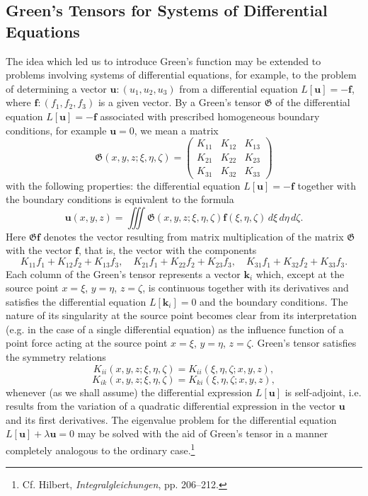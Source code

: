 \subsection{Green's Tensors for Systems of Differential Equations}
The idea which led us to introduce Green's function may be extended to problems involving systems of differential equations, for example, to the problem of determining a vector $\mathbf u:(u_1,u_2,u_3)$ from a differential equation $L[\mathbf u]=-\mathbf f$, where $\mathbf f:(f_1,f_2,f_3)$ is a given vector. By a Green's tensor $\mathfrak G$ of the differential equation $L[\mathbf u]=-\mathbf f$ associated with prescribed homogeneous boundary conditions, for example $\mathbf u=0$, we mean a matrix
\[
\mathfrak G(x,y,z;\xi,\eta,\zeta)=
\begin{pmatrix}
K_{11}&K_{12}&K_{13}\\
K_{21}&K_{22}&K_{23}\\
K_{31}&K_{32}&K_{33}
\end{pmatrix}
\]
with the following properties: the differential equation $L[\mathbf u]=-\mathbf f$ together with the boundary conditions is equivalent to the formula
\[
\mathbf u(x,y,z)=\iiint \mathfrak G(x,y,z;\xi,\eta,\zeta)\mathbf f(\xi,\eta,\zeta)\,d\xi\,d\eta\,d\zeta.
\]
Here $\mathfrak G\mathbf f$ denotes the vector resulting from matrix multiplication of the matrix $\mathfrak G$ with the vector $\mathbf f$, that is, the vector with the components
\[
K_{11}f_1+K_{12}f_2+K_{13}f_3,
\quad K_{21}f_1+K_{22}f_2+K_{23}f_3,
\quad K_{31}f_1+K_{32}f_2+K_{33}f_3.
\]
Each column of the Green's tensor represents a vector $\mathbf k_i$ which, except at the source point $x=\xi$, $y=\eta$, $z=\zeta$, is continuous together with its derivatives and satisfies the differential equation $L[\mathbf k_i]=0$ and the boundary conditions. The nature of its singularity at the source point becomes clear from its interpretation (e.g. in the case of a single differential equation) as the influence function of a point force acting at the source point $x=\xi$, $y=\eta$, $z=\zeta$. Green's tensor satisfies the symmetry relations
\[
K_{ii}(x,y,z;\xi,\eta,\zeta)=K_{ii}(\xi,\eta,\zeta;x,y,z),
\]
\[
K_{ik}(x,y,z;\xi,\eta,\zeta)=K_{ki}(\xi,\eta,\zeta;x,y,z),
\]
whenever (as we shall assume) the differential expression $L[\mathbf u]$ is self-adjoint, i.e. results from the variation of a quadratic differential expression in the vector $\mathbf u$ and its first derivatives. The eigenvalue problem for the differential equation $L[\mathbf u]+\lambda\mathbf u=0$ may be solved with the aid of Green's tensor in a manner completely analogous to the ordinary case.\footnote{Cf. Hilbert, \emph{Integralgleichungen}, pp. 206--212.}

